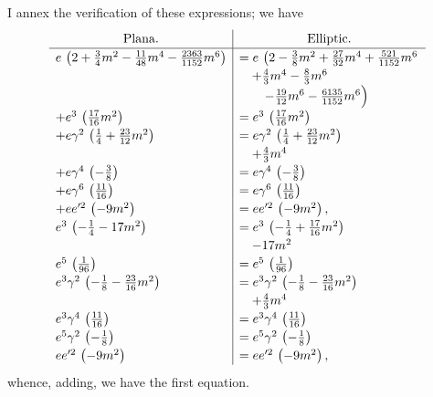 \documentclass[11pt]{article}
\begin{document}
I annex the verification of these expressions; we have
\[
\renewcommand{\arraystretch}{1.2}
\begin{array}{l|l}
\multicolumn{1}{c|}{\text{Plana.}} & \multicolumn{1}{c}{\text{Elliptic.}} \\
\hline
e\,\left(2 + \tfrac{3}{4}m^{2} - \tfrac{11}{48}m^{4} - \tfrac{2363}{1152}m^{6}\right)
   & = e\,\left(2 - \tfrac{3}{8}m^{2} + \tfrac{27}{32}m^{4} + \tfrac{521}{1152}m^{6}\right.\\
   & \quad + \tfrac{4}{3}m^{4} - \tfrac{8}{3}m^{6} \\
   & \quad\quad - \tfrac{19}{12}m^{6} - \tfrac{6135}{1152}m^{6}\Big) \\
+ e^{3}\,\left(\tfrac{17}{16}m^{2}\right)
   & = e^{3}\,\left(\tfrac{17}{16}m^{2}\right) \\
+ e\gamma^{2}\,\left(\tfrac{1}{4} + \tfrac{23}{12}m^{2}\right)
   & = e\gamma^{2}\,\left(\tfrac{1}{4} + \tfrac{23}{12}m^{2}\right) \\
& \quad + \tfrac{4}{3}m^{4} \\
+ e\gamma^{4}\,\left(-\tfrac{3}{8}\right) & = e\gamma^{4}\,\left(-\tfrac{3}{8}\right) \\
+ e\gamma^{6}\,\left(\tfrac{11}{16}\right) & = e\gamma^{6}\,\left(\tfrac{11}{16}\right) \\
+ ee'^{2}\,\left(-9m^{2}\right) & = ee'^{2}\,\left(-9m^{2}\right), \\
e^{3}\,\left(-\tfrac{1}{4} - 17m^{2}\right) & = e^{3}\,\left(-\tfrac{1}{4} + \tfrac{17}{16}m^{2}\right) \\
& \quad - 17m^{2} \\
e^{5}\,\left(\tfrac{1}{96}\right) & = e^{5}\,\left(\tfrac{1}{96}\right) \\
e^{3}\gamma^{2}\,\left(-\tfrac{1}{8} - \tfrac{23}{16}m^{2}\right)
   & = e^{3}\gamma^{2}\,\left(-\tfrac{1}{8} - \tfrac{23}{16}m^{2}\right) \\
   & \quad + \tfrac{4}{3}m^{4} \\
e^{3}\gamma^{4}\,\left(\tfrac{11}{16}\right) & = e^{3}\gamma^{4}\,\left(\tfrac{11}{16}\right) \\
e^{5}\gamma^{2}\,\left(-\tfrac{1}{8}\right) & = e^{5}\gamma^{2}\,\left(-\tfrac{1}{8}\right) \\
ee'^{2}\,\left(-9m^{2}\right) & = ee'^{2}\,\left(-9m^{2}\right),
\end{array}
\]
whence, adding, we have the first equation.
\end{document}
